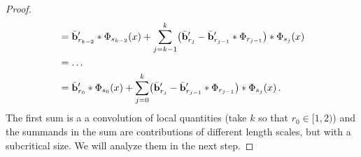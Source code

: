 \documentclass[11pt]{article} %
\numberwithin{equation}{section}
\theoremstyle{definition}
\newcommand{\bhom}{\bar{\mathbf{b}}}
\begin{document}
\begin{proof}
\begin{align}
& = 
\bhom_{r_{k-2}}'  \ast \Phi_{s_{k-2} }(x) 
+  \sum_{j=k-1}^{k} \bigl(  \bhom_{r_j}' - \bhom_{r_{j-1}}' \ast \Phi_{r_{j-1}} \bigr) \ast \Phi_{s_j}(x)
\\ \notag
& =  \ldots 
\\ 
& = 
\bhom_{r_{0}}'  \ast \Phi_{s_{0}}(x)  
+ \sum_{j=0}^{k} \bigl(  \bhom_{r_j}' - \bhom_{r_{j-1}}' \ast \Phi_{r_{j-1}} \bigr) \ast \Phi_{s_j}(x)
\,.
\end{align}
The first sum is a a convolution of local quantities (take $k$ so that $r_0 \in [1,2)$) and the summands in the sum are contributions of different length scales, but with a subcritical size. We will analyze them in the next step. 





\smallskip


\end{proof}
\end{document}
